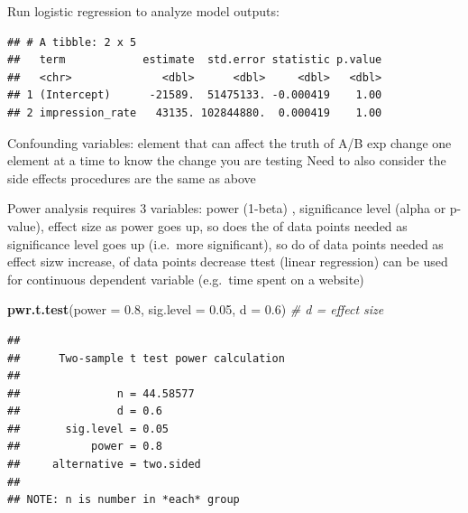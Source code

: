 \documentclass[]{book}
\newenvironment{Shaded}{\begin{snugshade}}{\end{snugshade}}
\newcommand{\CommentTok}[1]{\textcolor[rgb]{0.56,0.35,0.01}{\textit{#1}}}
\newcommand{\DataTypeTok}[1]{\textcolor[rgb]{0.13,0.29,0.53}{#1}}
\newcommand{\FloatTok}[1]{\textcolor[rgb]{0.00,0.00,0.81}{#1}}
\newcommand{\KeywordTok}[1]{\textcolor[rgb]{0.13,0.29,0.53}{\textbf{#1}}}
\newcommand{\NormalTok}[1]{#1}
\newcommand{\OperatorTok}[1]{\textcolor[rgb]{0.81,0.36,0.00}{\textbf{#1}}}
\newcommand{\StringTok}[1]{\textcolor[rgb]{0.31,0.60,0.02}{#1}}
\begin{document}
Run logistic regression to analyze model outputs:

\begin{Shaded}
\end{Shaded}

\begin{verbatim}
## # A tibble: 2 x 5
##   term            estimate  std.error statistic p.value
##   <chr>              <dbl>      <dbl>     <dbl>   <dbl>
## 1 (Intercept)      -21589.  51475133. -0.000419    1.00
## 2 impression_rate   43135. 102844880.  0.000419    1.00
\end{verbatim}

Confounding variables: element that can affect the truth of A/B exp
change one element at a time to know the change you are testing
Need to also consider the side effects
procedures are the same as above

Power analysis requires 3 variables: power (1-beta) , significance level (alpha or p-value), effect size
as power goes up, so does the of data points needed
as significance level goes up (i.e.~more significant), so do of data points needed
as effect sizw increase, of data points decrease
ttest (linear regression) can be used for continuous dependent variable (e.g.~time spent on a website)

\begin{Shaded}
\begin{Highlighting}[]
\KeywordTok{pwr.t.test}\NormalTok{(}\DataTypeTok{power =} \FloatTok{0.8}\NormalTok{,}
           \DataTypeTok{sig.level =} \FloatTok{0.05}\NormalTok{,}
           \DataTypeTok{d =} \FloatTok{0.6}\NormalTok{)  }\CommentTok{# d = effect size }
\end{Highlighting}
\end{Shaded}

\begin{verbatim}
## 
##      Two-sample t test power calculation 
## 
##               n = 44.58577
##               d = 0.6
##       sig.level = 0.05
##           power = 0.8
##     alternative = two.sided
## 
## NOTE: n is number in *each* group
\end{verbatim}
\end{document}
